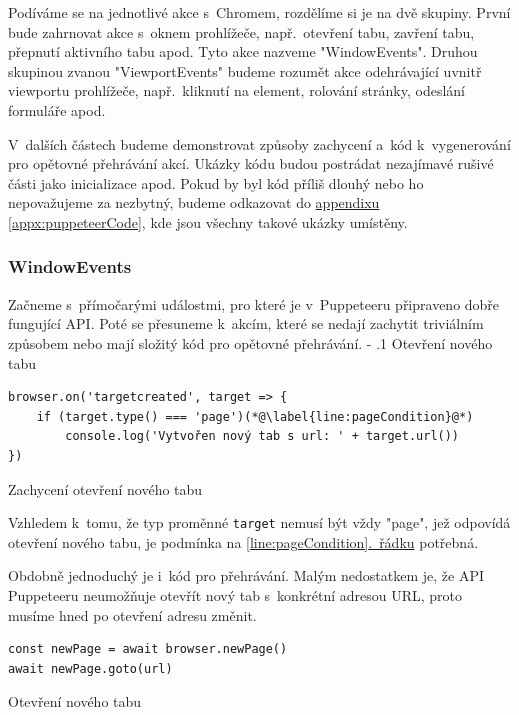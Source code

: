 \documentclass[12pt, a4paper, twoside]{article}
\makeatletter
\newcommand{\codefigureSpacing}{1.2}
\newcommand{\refAddedText}[3]{\hyperref[#1]{#2\ref{#1}#3}}
\newcommand{\lineref}[2]{\refAddedText{#1}{}{.~#2}}
\renewcommand\paragraph{%
	\@startsection{subparagraph}{5}{0mm}%
	{-\baselineskip}%
	{.1\baselineskip}%
	{\normalfont\normalsize\bfseries}}
\makeatother
\begin{document}
	Podíváme se na jednotlivé akce s~Chromem, rozdělíme si je na dvě skupiny. První bude zahrnovat akce s~oknem prohlížeče, např.~otevření tabu, zavření tabu, přepnutí aktivního tabu apod. Tyto akce nazveme "WindowEvents". Druhou skupinou zvanou "ViewportEvents" budeme rozumět akce odehrávající uvnitř viewportu prohlížeče, např.~kliknutí na element, rolování stránky, odeslání formuláře apod.
	
	V~dalších částech budeme demonstrovat způsoby zachycení a~kód k~vygenerování pro opětovné přehrávání akcí. Ukázky kódu budou postrádat nezajímavé rušivé části jako inicializace apod. Pokud by byl kód příliš dlouhý nebo ho nepovažujeme za nezbytný, budeme odkazovat do \refAddedText{appx:puppeteerCode}{appendixu }{}, kde jsou všechny takové ukázky umístěny.
	\subsubsection{WindowEvents}
	Začneme s~přímočarými událostmi, pro které je v~Puppeteeru připraveno dobře fungující API. Poté se přesuneme k~akcím, které se nedají zachytit triviálním způsobem nebo mají složitý kód pro opětovné přehrávání.
	\paragraph{Otevření nového tabu}
	\begin{codefigure}[H]
		\renewcommand\baselinestretch{\codefigureSpacing}
		\begin{lstlisting}[style=MyJavaScript]
browser.on('targetcreated', target => {
	if (target.type() === 'page')(*@\label{line:pageCondition}@*)
		console.log('Vytvořen nový tab s url: ' + target.url())
})
		\end{lstlisting}
	\caption{Zachycení otevření nového tabu}
	\label{codefig:openNewTab}
	\end{codefigure}
	Vzhledem k~tomu, že typ proměnné \texttt{target} nemusí být vždy "page", jež odpovídá otevření nového tabu, je podmínka na \lineref{line:pageCondition}{řádku} potřebná.
	
	Obdobně jednoduchý je i~kód pro přehrávání. Malým nedostatkem je, že API Puppeteeru neumožňuje otevřít nový tab s~konkrétní adresou URL, proto musíme hned po otevření adresu změnit.
	\begin{codefigure}[H]
		\renewcommand\baselinestretch{\codefigureSpacing}
		\begin{lstlisting}[style=MyJavaScript]
const newPage = await browser.newPage()
await newPage.goto(url)
		\end{lstlisting}
	\caption{Otevření nového tabu}
	\end{codefigure}
	\newpage
\end{document}
